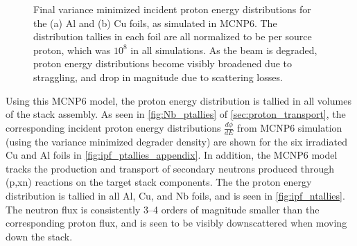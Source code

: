 \begin{figure}
    \centering    
    \caption{Final variance minimized incident proton energy distributions for the (a) Al and (b) Cu foils, as simulated in MCNP6. The distribution tallies in each foil are all normalized to be per source proton, which was $10^8$ in all simulations. As the beam is degraded, proton energy distributions become visibly broadened due to straggling, and drop in magnitude due to scattering losses.}
     \label{fig:fe_ptallies_appendix}
\end{figure}



Using this MCNP6 model, the proton energy distribution is tallied in all volumes of the stack assembly.
As seen in \autoref{fig:Nb_ptallies} of \autoref{sec:proton_transport}, the corresponding incident proton  energy distributions $\frac{d\phi}{dE}$ from MCNP6 simulation (using the variance minimized degrader density) are shown for the six irradiated Cu and Al  foils in \autoref{fig:ipf_ptallies_appendix}. 
In addition, the MCNP6 model tracks the production and transport of secondary neutrons produced through (p,xn) reactions on the target stack components.
The the proton energy distribution is tallied in all Al, Cu, and Nb foils, and is seen in \autoref{fig:ipf_ntallies}. 
The neutron flux is consistently 3--4 orders of magnitude smaller than the corresponding proton flux, and is seen to be visibly  downscattered when moving down the stack.

